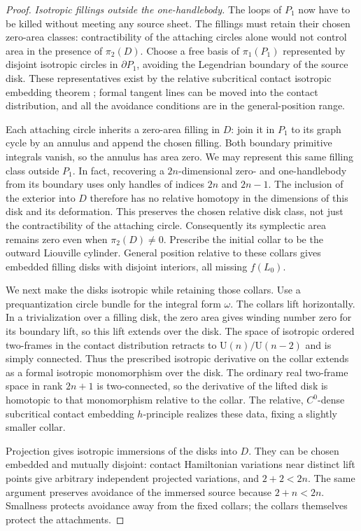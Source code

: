 \documentclass[11pt]{article}
\numberwithin{equation}{section}
\theoremstyle{definition}
\theoremstyle{remark}
\begin{document}
\begin{proof}
\emph{Isotropic fillings outside the one-handlebody.}
The loops of $P_1$ now have to be killed without meeting any source
sheet.  The fillings must retain their chosen zero-area classes:
contractibility of the attaching circles alone would not control area
in the presence of $\pi_2(D)$.  Choose a free basis of $\pi_1(P_1)$
represented by disjoint isotropic circles in $\partial P_1$, avoiding the Legendrian boundary of the
source disk.  These representatives exist by the relative subcritical
contact isotropic embedding theorem
\cite[Theorem~12.4.1]{EliashbergMishachev2002}; formal tangent lines
can be moved into the contact distribution, and all the avoidance
conditions are in the general-position range.

Each attaching circle inherits a zero-area filling in $D$: join it
in $P_1$ to its graph cycle by an annulus and append the chosen
filling.  Both boundary primitive integrals vanish, so the annulus
has area zero.  We may represent this same filling class outside $P_1$.
In fact, recovering a $2n$-dimensional zero- and one-handlebody from
its boundary uses only handles of indices $2n$ and $2n-1$.
The inclusion of the exterior into $D$ therefore has no relative
homotopy in the dimensions of this disk and its deformation.
This preserves the chosen relative disk class, not just the
contractibility of the attaching circle.  Consequently its
symplectic area remains zero even when $\pi_2(D)\neq0$.
Prescribe the initial collar to be the outward Liouville cylinder.
General position relative to these collars gives embedded filling
disks with disjoint interiors, all missing $f(L_0)$.

We next make the disks isotropic while retaining those collars.
Use a prequantization circle bundle for the integral form $\omega$.
The collars lift horizontally.  In a trivialization over a filling
disk, the zero area gives winding number zero for its boundary
lift, so this lift extends over the disk.  The space of isotropic
ordered two-frames in the contact distribution retracts to
$\mathrm U(n)/\mathrm U(n-2)$ and is simply connected.  Thus the
prescribed isotropic derivative on the collar extends as a formal
isotropic monomorphism over the disk.  The ordinary real two-frame
space in rank $2n+1$ is two-connected, so the derivative of the
lifted disk is homotopic to that monomorphism relative to the
collar.  The relative, $C^0$-dense subcritical contact embedding
$h$-principle realizes these data, fixing a slightly smaller collar.

Projection gives isotropic immersions of the disks into $D$.
They can be chosen embedded and mutually disjoint: contact
Hamiltonian variations near distinct lift points give arbitrary
independent projected variations, and $2+2<2n$.  The same argument
preserves avoidance of the immersed source because $2+n<2n$.
Smallness protects avoidance away from the fixed collars; the
collars themselves protect the attachments.


\end{proof}
\end{document}
